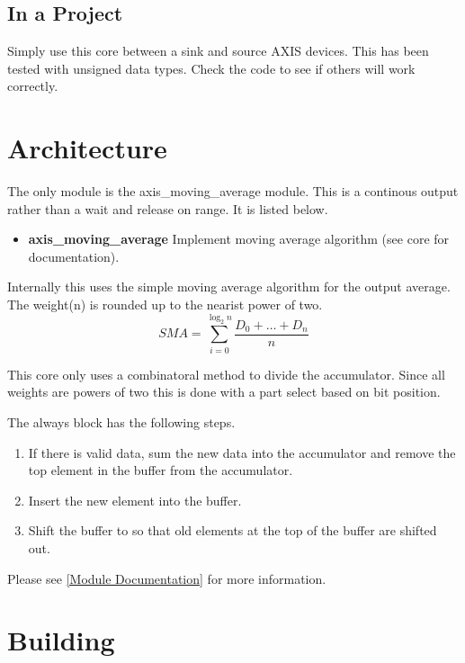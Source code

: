 

\subsection{In a Project}
\par
Simply use this core between a sink and source AXIS devices. This has been tested with unsigned data types. Check the code to see if others will work correctly.

\section{Architecture}
\par
The only module is the axis\_moving\_average module. This is a continous output rather than a wait and release on range. It is listed below.

\begin{itemize}
  \item \textbf{axis\_moving\_average} Implement moving average algorithm (see core for documentation).
\end{itemize}

Internally this uses the simple moving average algorithm for the output average. The weight(n) is rounded up to the nearist power of two.
\begin{equation}
  SMA = \sum_{i=0}^{\log_2 n}\frac{D_0+\dots+D_n}{n}
\end{equation}

\par
This core only uses a combinatoral method to divide the accumulator. Since all weights are powers of two this is done with a part select based on bit position.

\par
The always block has the following steps.
\begin{enumerate}
\item If there is valid data, sum the new data into the accumulator and remove the top element in the buffer from the accumulator.
\item Insert the new element into the buffer.
\item Shift the buffer to so that old elements at the top of the buffer are shifted out.
\end{enumerate}

Please see \ref{Module Documentation} for more information.

\section{Building}

